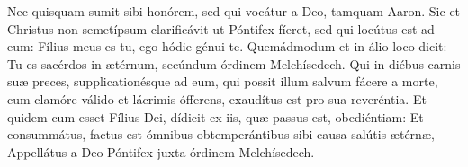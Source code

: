 
Nec quisquam sumit sibi honórem, sed qui vocátur a Deo, tamquam Aaron. 
Sic et Chri\-stus non semetí\-psum clarificávit ut Póntifex fíeret, sed qui locútus est ad eum: Fílius meus es tu, ego hódie génui te. 
Quemádmodum et in álio loco dicit: Tu es sacérdos in ætérnum, secúndum órdinem Melchísedech. 
Qui in diébus carnis suæ preces, supplicationésque ad eum, qui possit illum salvum fácere a morte, cum clamóre válido et lácrimis ófferens, exaudítus est pro sua reveréntia. 
Et quidem cum esset Fílius Dei, dídicit ex iis, quæ passus est, obediéntiam:
Et consummátus, fa\-ctus est ómnibus obtemperántibus sibi causa salútis ætérnæ, 
Appellátus a Deo Póntifex juxta órdinem Melchísedech.